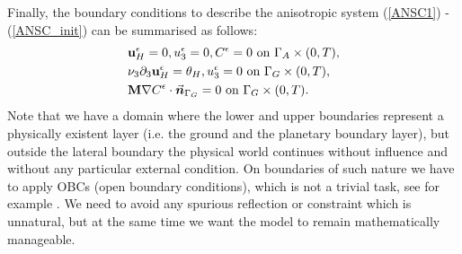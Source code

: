 \documentclass[11pt]{article}
\begin{document}
Finally, the boundary conditions to describe the anisotropic system (\ref{ANSC1}) - (\ref{ANSC_init}) can be summarised as follows:
\begin{equation} \label{ANSC_bc}
\begin{split}
& \mathbf{u}^\epsilon_H = 0, u^\epsilon_3 = 0, C^\epsilon = 0 \text{ on } \Gamma_A \times (0,T), \\
& \nu_3 \partial_3 \mathbf{u}^\epsilon_H = \theta_H, u^\epsilon_3 = 0 \text{ on } \Gamma_G \times (0,T), \\
& \mathbf{M} \nabla C^\epsilon \cdot \vec{\boldsymbol{n}}_{\Gamma_G} = 0 \text{ on } \Gamma_G \times (0,T).
\end{split} \raisetag{40pt}
\end{equation}
Note that we have a domain where the lower and upper boundaries represent a physically existent layer (i.e. the ground and the planetary boundary layer), but outside the lateral boundary the physical world continues without influence and without any particular external condition. On boundaries of such nature we have to apply OBCs (open boundary conditions), which is not a trivial task, see for example \cite{wang2014ocean}. We need to avoid any spurious reflection or constraint which is unnatural, but at the same time we want the model to remain mathematically manageable.
\end{document}
